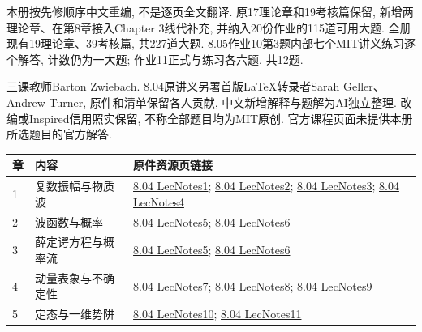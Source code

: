 本册按先修顺序中文重编, 不是逐页全文翻译. 原17理论章和19考核篇保留, 新增两理论章、在第8章接入Chapter 3线代补充, 并纳入20份作业的115道可用大题. 全册现有19理论章、39考核篇, 共227道大题. 8.05作业10第3题内部七个MIT讲义练习逐个解答, 计数仍为一大题; 作业11正式与练习各六题, 共12题.

三课教师Barton Zwiebach. 8.04原讲义另署首版LaTeX转录者Sarah Geller、Andrew Turner, 原件和清单保留各人贡献, 中文新增解释与题解为AI独立整理. 改编或Inspired信用照实保留, 不称全部题目均为MIT原创. 官方课程页面未提供本册所选题目的官方解答.
\begin{longtable}{p{}p{}p{}}
\toprule 章 & 内容 & 原件资源页链接\\\midrule\endhead
1 & 复数振幅与物质波 & \href{https://ocw.mit.edu/courses/8-04-quantum-physics-i-spring-2016/resources/mit8_04s16_lecnotes1/}{8.04 LecNotes1}; \href{https://ocw.mit.edu/courses/8-04-quantum-physics-i-spring-2016/resources/mit8_04s16_lecnotes2/}{8.04 LecNotes2}; \href{https://ocw.mit.edu/courses/8-04-quantum-physics-i-spring-2016/resources/mit8_04s16_lecnotes3/}{8.04 LecNotes3}; \href{https://ocw.mit.edu/courses/8-04-quantum-physics-i-spring-2016/resources/mit8_04s16_lecnotes4/}{8.04 LecNotes4}\\
2 & 波函数与概率 & \href{https://ocw.mit.edu/courses/8-04-quantum-physics-i-spring-2016/resources/mit8_04s16_lecnotes5/}{8.04 LecNotes5}; \href{https://ocw.mit.edu/courses/8-04-quantum-physics-i-spring-2016/resources/mit8_04s16_lecnotes6/}{8.04 LecNotes6}\\
3 & 薛定谔方程与概率流 & \href{https://ocw.mit.edu/courses/8-04-quantum-physics-i-spring-2016/resources/mit8_04s16_lecnotes5/}{8.04 LecNotes5}; \href{https://ocw.mit.edu/courses/8-04-quantum-physics-i-spring-2016/resources/mit8_04s16_lecnotes6/}{8.04 LecNotes6}\\
4 & 动量表象与不确定性 & \href{https://ocw.mit.edu/courses/8-04-quantum-physics-i-spring-2016/resources/mit8_04s16_lecnotes7/}{8.04 LecNotes7}; \href{https://ocw.mit.edu/courses/8-04-quantum-physics-i-spring-2016/resources/mit8_04s16_lecnotes8/}{8.04 LecNotes8}; \href{https://ocw.mit.edu/courses/8-04-quantum-physics-i-spring-2016/resources/mit8_04s16_lecnotes9/}{8.04 LecNotes9}\\
5 & 定态与一维势阱 & \href{https://ocw.mit.edu/courses/8-04-quantum-physics-i-spring-2016/resources/mit8_04s16_lecnotes10/}{8.04 LecNotes10}; \href{https://ocw.mit.edu/courses/8-04-quantum-physics-i-spring-2016/resources/mit8_04s16_lecnotes11/}{8.04 LecNotes11}\\

\end{longtable}
